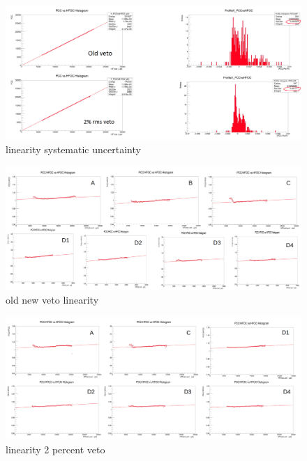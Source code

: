 \begin{figure}[!htp]
\centering
\includegraphics[width=1\textwidth]{ashish_thesis/pcc_hfoc_linearity_sys_unc.png}
\caption{%
linearity systematic uncertainty
}
\label{fig:linearitypcchfoc}
\end{figure}

\begin{figure}[!htp]
\centering
\includegraphics[width=1\textwidth]{ashish_thesis/pcc_hfoc_new_veto_linearity.png}
\caption{%
old new veto linearity
}
\label{fig:pcc_hf_new_lin}
\end{figure}

\begin{figure}[!htp]
\centering
\includegraphics[width=1\textwidth]{ashish_thesis/pcc_hfoc_linearity_sys_unc_2per_common_veto.png}
\caption{%
linearity 2 percent veto
}
\label{fig:linearity2perveto}
\end{figure}


